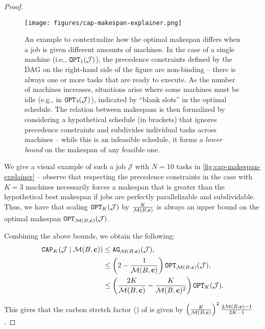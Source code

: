 \begin{proof}
\begin{figure}[h]
    \centering
    \texttt{[image: figures/cap-makespan-explainer.png]} \vspace{-1em}
    \caption{ An example to contextualize how the optimal makespan differs when a job is given different amounts of machines.  In the case of a single machine (i.e., $\texttt{OPT}_1(\mathcal{J})$), the precedence constraints defined by the DAG on the right-hand side of the figure are non-binding -- there is always one or more tasks that are ready to execute.  As the number of machines increases, situations arise where some machines must be idle (e.g., in $\texttt{OPT}_3(\mathcal{J})$), indicated by ``blank slots'' in the optimal schedule.  The relation between makespans is then formalized by considering a hypothetical schedule (in brackets) that ignores precedence constraints and subdivides individual tasks across machines -- while this is an infeasible schedule, it forms a \textit{lower bound} on the makespan of any feasible one. }
    \label{fig:cap-makespan-explainer}
\end{figure}

We give a visual example of such a job $\mathcal{J}$ with $N=10$ tasks in \autoref{fig:cap-makespan-explainer} -- observe that respecting the precedence constraints in the case with $K=3$ machines necessarily forces a makespan that is greater than the hypothetical best makespan if jobs are perfectly parallelizable and subdividable. 
Thus, we have that scaling $\texttt{OPT}_K(\mathcal{J})$ by $\frac{K}{\mathcal{M}(B, {\mathbf{c}})}$ is always an upper bound on the optimal makespan $\texttt{OPT}_{\mathcal{M}(B, {\mathbf{c}})}(\mathcal{J})$.



Combining the above bounds, we obtain the following:
\begin{align*}
\texttt{CAP}_K(\mathcal{J} \mid \mathcal{M}(B, {\mathbf{c}}) ) &\le \texttt{AG}_{\mathcal{M}(B, {\mathbf{c}})}(\mathcal{J}),\\
&\le \left(2 - \frac{1}{\mathcal{M}(B, {\mathbf{c}})}\right) \texttt{OPT}_{\mathcal{M}(B, {\mathbf{c}})}(\mathcal{J}),\\
&\le \left( \frac{2K}{\mathcal{M}(B, {\mathbf{c}})} - \frac{K}{\mathcal{M}(B, {\mathbf{c}})^{2}} \right) \texttt{OPT}_K(\mathcal{J}).
\end{align*}

This gives that the carbon stretch factor () of \CAP is given by $\left(\frac{K}{\mathcal{M}(B, {\mathbf{c}})}\right)^2 \frac{2\mathcal{M}(B, {\mathbf{c}})-1}{2K-1}$. 
\end{proof}

